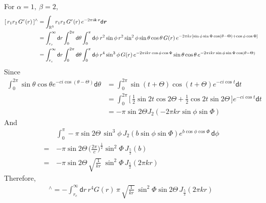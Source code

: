 \documentclass[aps,pre,preprint,unsortedaddress]{revtex4}
\renewcommand{\v}[1]{\textbf{\textit{#1}}}
\renewcommand{\d}[1]{\textsf{#1}}
\begin{document}
For $\alpha = 1,\ \beta = 2$,
\begin{align}\nonumber
  [\,r_1 r_2\,G^c(r)\,]^{\wedge} 
  &= \int_{\mathbb R^3} r_1 r_2\,G^c(r)\, e^{-2\pi i\v k\cdot\v r}\d d\v r \\\nonumber
  &= \int_{r_c}^\infty \d dr \int_{0}^{2\pi} \d d\theta \int_0^\pi\d d\phi\:
  r^2\sin\phi \,r^2 \sin^2\phi \sin\theta\cos\theta \,G(r)\,
  e^{-2\pi k r[\sin\phi\sin\Phi\cos(\theta - \Theta) + \cos\phi\cos\Phi]} \\
  &= \int_{r_c}^\infty \d dr \int_{0}^{2\pi} \d d\theta \int_0^\pi\d d\phi\:
  r^4\sin^3\phi\,G(r)\,e^{-2\pi i kr\cos\phi\cos\Phi}
  \sin\theta\cos\theta\,e^{-2\pi i kr\sin\phi\sin\Phi\cos(\theta- \Theta)}
\end{align}
Since
\begin{align}\nonumber
  \int_0^{2\pi}\sin\theta\cos\theta e^{-c i\cos(\theta - \Theta)} \d d\theta
  & =
  \int_0^{2\pi}\sin(t+\Theta)\cos(t+\Theta)
  e^{-c i \cos t} \d dt \\\nonumber
  &=
  \int_0^{2\pi}
  \Big[\,
  \frac12 \sin 2t\cos 2\Theta + \frac12\cos 2t\sin 2\Theta
  \,\Big]
  e^{-c i\cos t} \d dt \\\nonumber
  &=
  -\pi \sin 2\Theta J_2(-2\pi kr\sin\phi\sin\Phi)
\end{align}
And
\begin{align}\nonumber
  &
  \int_0^\pi -\pi \sin 2\Theta\,
  \sin^3\phi\,
  J_2(b\sin\phi\sin\Phi) e^{b\cos\phi\cos\Phi} \,\d d\phi \\\nonumber
  = \,&
  -\pi\sin 2\Theta\,
  \big(
  \frac{2\pi}{c}
  \big)^{\frac12}
  \sin^2\Phi \,J_{\frac52}(b) \\\nonumber
  = \,&
  -\pi\sin 2\Theta\,
  \sqrt{\frac1{kr}}\:
  \sin^2\Phi \,J_{\frac52}(2\pi kr) 
\end{align}
Therefore,
\begin{align}
  [\,r_1 r_2\,G^c(r)\,]^{\wedge} 
  =
  -\int_{r_c}^\infty
  \d dr\,
  r^4G(r)\,\pi\,
  \sqrt{\frac1{kr}}\:
  \sin^2\Phi\sin 2\Theta\,J_{\frac52}(2\pi kr)\,
\end{align}
\end{document}

